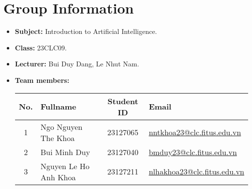 \section{Group Information}
\begin{itemize}
  \item \textbf{Subject:} Introduction to Artificial Intelligence.
  \item \textbf{Class:} 23CLC09.
  \item \textbf{Lecturer:} Bui Duy Dang, Le Nhut Nam.
  \item \textbf{Team members:}
        \begin{center}
          \renewcommand{\arraystretch}{1.5}
          \begin{tabular}{|c|l|c|l|}
            \hline
            \textbf{No.} & \textbf{Fullname}     & \textbf{Student ID} & \textbf{Email}                                                         \\\hline
            1            & Ngo Nguyen The Khoa   & 23127065            & \href{mailto:nntkhoa23@clc.fitus.edu.vn}{nntkhoa23@clc.fitus.edu.vn}   \\\hline
            2            & Bui Minh Duy          & 23127040            & \href{mailto:bmduy23@clc.fitus.edu.vn}{bmduy23@clc.fitus.edu.vn}       \\\hline
            3            & Nguyen Le Ho Anh Khoa & 23127211            & \href{mailto:nlhakhoa23@clc.fitus.edu.vn}{nlhakhoa23@clc.fitus.edu.vn} \\\hline
          \end{tabular}
        \end{center}
\end{itemize}
